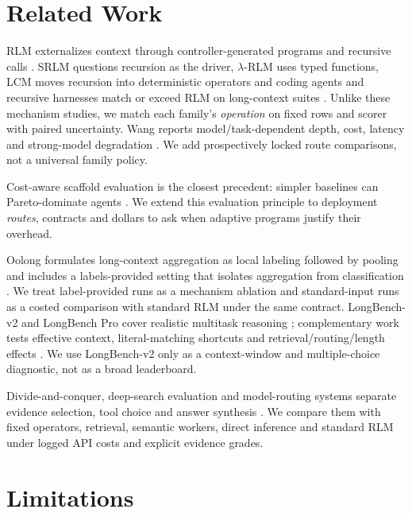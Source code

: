 \documentclass[letterpaper]{article}
\begin{document}
\section{Related Work}

RLM externalizes context through controller-generated programs and recursive calls \citep{zhang2025rlm}. SRLM questions recursion as the driver, $\lambda$-RLM uses typed functions, LCM moves recursion into deterministic operators and coding agents and recursive harnesses match or exceed RLM on long-context suites \citep{srlm2026,lambdarlm2026,ehrlich2026lcm,cao2026codingagents,lumer2026rah}. Unlike these mechanism studies, we match each family's \emph{operation} on fixed rows and scorer with paired uncertainty. Wang reports model/task-dependent depth, cost, latency and strong-model degradation \citep{wang2026thinkdontoverthink}. We add prospectively locked route comparisons, not a universal family policy.

Cost-aware scaffold evaluation is the closest precedent: simpler baselines can Pareto-dominate agents \citep{kapoor2024agentsmatter}. We extend this evaluation principle to deployment \emph{routes}, contracts and dollars to ask when adaptive programs justify their overhead.

Oolong formulates long-context aggregation as local labeling followed by pooling and includes a labels-provided setting that isolates aggregation from classification \citep{bertsch2025oolong}. We treat label-provided runs as a mechanism ablation and standard-input runs as a costed comparison with standard RLM under the same contract. LongBench-v2 and LongBench Pro cover realistic multitask reasoning \citep{bai2025longbenchv2,longbenchpro2026}; complementary work tests effective context, literal-matching shortcuts and retrieval/routing/length effects \citep{hsieh2024ruler,yen2025helmet,zhang2024infinitebench,nolima2025,li2025lara}. We use LongBench-v2 only as a context-window and multiple-choice diagnostic, not as a broad leaderboard.

Divide-and-conquer, deep-search evaluation and model-routing systems separate evidence selection, tool choice and answer synthesis \citep{xu2026divideconquer,song2026demystifying,ong2024routellm}. We compare them with fixed operators, retrieval, semantic workers, direct inference and standard RLM under logged API costs and explicit evidence grades.

\section{Limitations}
\end{document}

